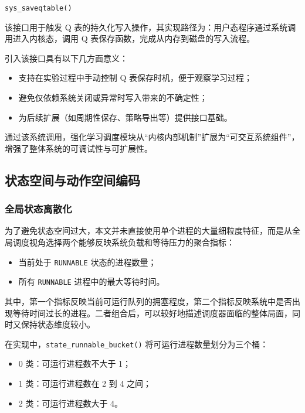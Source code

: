 \begin{center}
\texttt{sys\_saveqtable()}
\end{center}

该接口用于触发 Q 表的持久化写入操作，其实现路径为：用户态程序通过系统调用进入内核态，调用 Q 表保存函数，完成从内存到磁盘的写入流程。

引入该接口具有以下几方面意义：

\begin{itemize}
\item 支持在实验过程中手动控制 Q 表保存时机，便于观察学习过程；
\item 避免仅依赖系统关闭或异常时写入带来的不确定性；
\item 为后续扩展（如周期性保存、策略导出等）提供接口基础。
\end{itemize}

通过该系统调用，强化学习调度模块从“内核内部机制”扩展为“可交互系统组件”，增强了整体系统的可调试性与可扩展性。

\subsection{状态空间与动作空间编码}

\subsubsection{全局状态离散化}

为了避免状态空间过大，本文并未直接使用单个进程的大量细粒度特征，而是从全局调度视角选择两个能够反映系统负载和等待压力的聚合指标：

\begin{itemize}
\item 当前处于 \texttt{RUNNABLE} 状态的进程数量；
\item 所有 \texttt{RUNNABLE} 进程中的最大等待时间。
\end{itemize}

其中，第一个指标反映当前可运行队列的拥塞程度，第二个指标反映系统中是否出现等待时间过长的进程。二者组合后，可以较好地描述调度器面临的整体局面，同时又保持状态维度较小。

在实现中，\texttt{state\_runnable\_bucket()} 将可运行进程数量划分为三个桶：

\begin{itemize}
\item 0 类：可运行进程数不大于 1；
\item 1 类：可运行进程数在 2 到 4 之间；
\item 2 类：可运行进程数大于 4。
\end{itemize}

